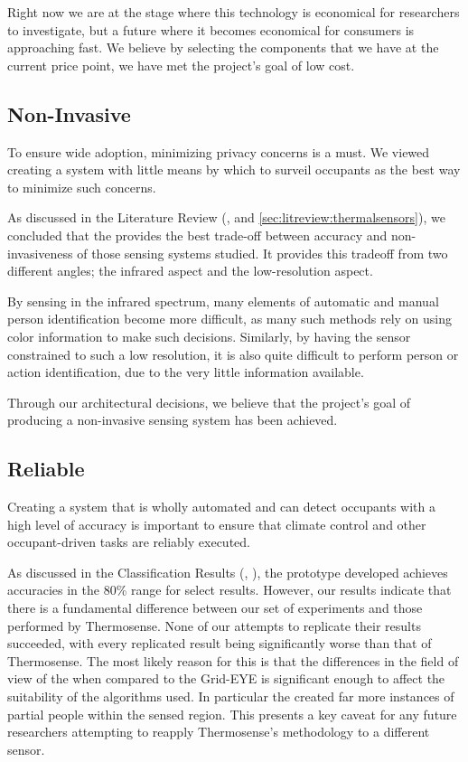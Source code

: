 \documentclass[../thesis/thesis.tex]{subfiles}
\begin{document}
Right now we are at the stage where this technology is economical for researchers to investigate, but a future where it becomes economical for consumers is approaching fast. We believe by selecting the components that we have at the current price point, we have met the project's goal of low cost.

\subsection{Non-Invasive}
To ensure wide adoption, minimizing privacy concerns is a must. We viewed creating a system with little means by which to  surveil occupants as the best way to minimize such concerns.

As discussed in the Literature Review (,  and \ref{sec:litreview:thermalsensors}), we concluded that the \mlx provides the best trade-off between accuracy and non-invasiveness of those sensing systems studied. It provides this tradeoff from two different angles; the infrared aspect and the low-resolution aspect. 

By sensing in the infrared spectrum, many elements of automatic and manual person identification become more difficult, as many such methods rely on using color information to make such decisions. Similarly, by having the sensor constrained to such a low resolution, it is also quite difficult to perform person or action identification, due to the very little information available.

Through our architectural decisions, we believe that the project's goal of producing a non-invasive sensing system has been achieved.

\subsection{Reliable}
Creating a system that is wholly automated and can detect occupants with a high level of accuracy is important to ensure that climate control and other occupant-driven tasks are reliably executed.

As discussed in the Classification Results (, ), the prototype developed achieves accuracies in the 80\% range for select results. However, our results indicate that there is a fundamental difference between our set of experiments and those performed by Thermosense. None of our attempts to replicate their results succeeded, with every replicated result being significantly worse than that of Thermosense. The most likely reason for this is that the differences in the field of view of the \mlx when compared to the Grid-EYE is significant enough to affect the suitability of the algorithms used. In particular the \mlx created far more instances of partial people within the sensed region. This presents a key caveat for any future researchers attempting to reapply Thermosense's methodology to a different sensor.
\end{document}
